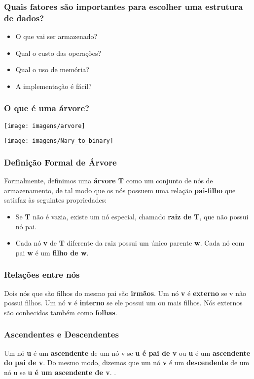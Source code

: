 \documentclass{beamer}
\begin{document}
\begin{frame}
\frametitle{Quais fatores são importantes para escolher uma estrutura de dados?}\pause

\begin{itemize}
\item O que vai ser armazenado?\pause
\item Qual o custo das operações?\pause
\item Qual o uso de memória?\pause
\item A implementação é fácil?
\end{itemize}
\end{frame}

\begin{frame}
\frametitle{O que é uma árvore?}
\texttt{[image: imagens/arvore]}

\end{frame}



\begin{frame}
\texttt{[image: imagens/Nary\_to\_binary]}
\frametitle{Definição Formal de Árvore}
Formalmente, definimos uma \textbf{árvore T} como um conjunto de nós de armazenamento, de tal modo que os nós possuem uma relação \textbf{pai-filho} que satisfaz às seguintes propriedades:
\begin{itemize}
\item Se \textbf{T} não é vazia, existe um nó especial, chamado \textbf{raiz de T}, que não possui nó pai.
\item Cada nó \textbf{v} de \textbf{T} diferente da raiz possui um único parente \textbf{w}. Cada nó com pai \textbf{w} é um \textbf{filho de w}.
\end{itemize}

\end{frame}

\begin{frame}
\frametitle{Relações entre nós}
Dois nós que são filhos do mesmo pai são \textbf{irmãos}. Um nó \textbf{v} é \textbf{externo} se v não possui filhos. Um nó \textbf{v} é \textbf{interno} se ele possui um ou mais filhos. Nós externos são conhecidos também como \textbf{folhas}.


\end{frame}

\begin{frame}
\frametitle{Ascendentes e Descendentes}
Um nó \textbf{u} é um \textbf{ascendente} de um nó v se \textbf{u é pai de v} ou \textbf{u} é um \textbf{ascendente do pai de v}. Do mesmo modo, dizemos que um nó \textbf{v} é um \textbf{descendente} de um nó u se \textbf{u é um ascendente de v}.
.
\end{frame}
\end{document}
